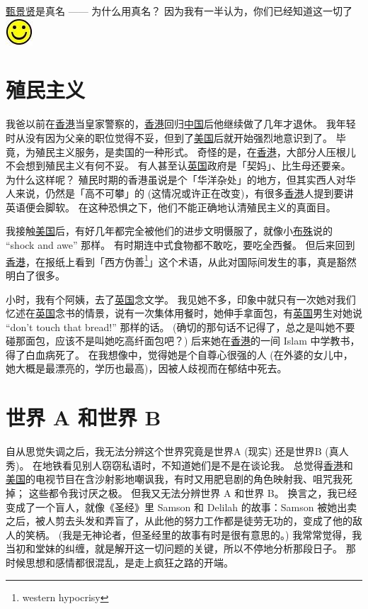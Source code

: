 \documentclass[12pt]{report}
\newcommand*\smiley{\includegraphics[scale=0.5]{smiley.jpg}}
\begin{document}
\underline{甄景贤}是真名 —— 为什么用真名？ 因为我有一半认为，你们已经知道这一切了 \smiley

\chapter{殖民主义}

我爸以前在\underline{香港}当皇家警察的，\underline{香港}回归\underline{中国}后他继续做了几年才退休。 我年轻时从没有因为父亲的职位觉得不妥，但到了\underline{美国}后就开始强烈地意识到了。 毕竟，为殖民主义服务，是卖国的一种形式。 奇怪的是，在\underline{香港}，大部分人压根儿不会想到殖民主义有何不妥。 有人甚至认\underline{英国}政府是「契妈」、比生母还要亲。 为什么这样呢？ 殖民时期的香港虽说是个「华洋杂处」的地方，但其实西人对华人来说，仍然是「高不可攀」的 (这情况或许正在改变)，有很多\underline{香港}人提到要讲英语便会脚软。 在这种恐惧之下，他们不能正确地认清殖民主义的真面目。

我接触\underline{美国}后，有好几年都完全被他们的进步文明慑服了，就像小\underline{布殊}说的 ``shock and awe'' 那样。 有时期连中式食物都不敢吃，要吃全西餐。 但后来回到\underline{香港}，在报纸上看到「西方伪善\footnote{western hypocrisy}」这个术语，从此对国际间发生的事，真是豁然明白了很多。

小时，我有个阿姨，去了\underline{英国}念文学。 我见她不多，印象中就只有一次她对我们忆述在\underline{英国}念书的情景，说有一次集体用餐时，她伸手拿面包，有\underline{英国}男生对她说 ``don't touch that bread!'' 那样的话。 (确切的那句话不记得了，总之是叫她不要碰那面包，应该不是叫她吃高纤面包吧？) 后来她在\underline{香港}的一间 Islam 中学教书，得了白血病死了。 在我想像中，觉得她是个自尊心很强的人 (在外婆的女儿中，她大概是最漂亮的，学历也最高)，因被人歧视而在郁结中死去。

\chapter{世界 A 和世界 B}

自从思觉失调之后，我无法分辨这个世界究竟是世界A (现实) 还是世界B (真人秀)。 在地铁看见别人窃窃私语时，不知道她们是不是在谈论我。 总觉得\underline{香港}和\underline{美国}的电视节目在含沙射影地嘲讽我，有时又用肥皂剧的角色映射我、咀咒我死掉； 这些都令我讨厌之极。 但我又无法分辨世界 A 和世界 B。 换言之，我已经变成了一个盲人，就像《圣经》里 Samson 和 Delilah 的故事：Samson 被她出卖之后，被人剪去头发和弄盲了，从此他的努力工作都是徒劳无功的，变成了他的敌人的笑柄。 (我是无神论者，但圣经里的故事有时是很有意思的。) 我常常觉得，我当初和堂妹的纠缠，就是解开这一切问题的关键，所以不停地分析那段日子。 那时候思想和感情都很混乱，是走上疯狂之路的开端。
\end{document}
